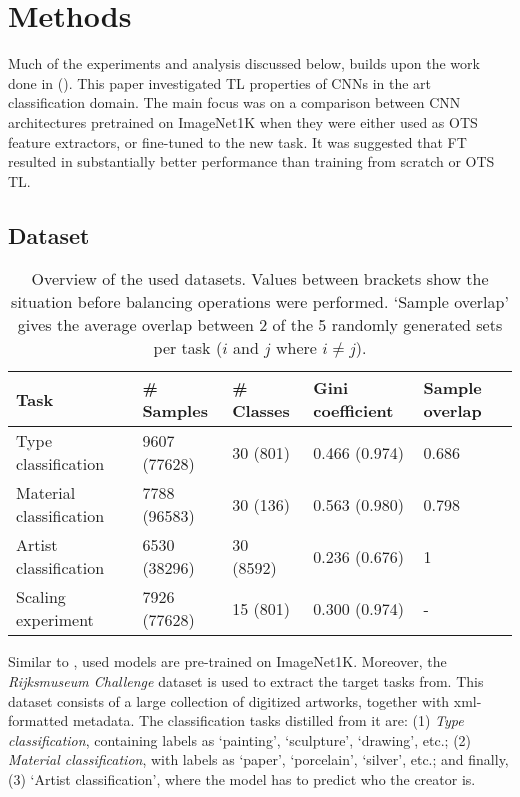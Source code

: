 \section{Methods}

Much of the experiments and analysis discussed below, builds upon the work done in \citeauthor{sabatelli2018deep} (\citeyear{sabatelli2018deep}). This paper investigated TL properties of CNNs in the art classification domain. The main focus was on a comparison between CNN architectures pretrained on ImageNet1K when they were either used as OTS feature extractors, or fine-tuned to the new task. It was suggested that FT resulted in substantially better performance than training from scratch or OTS TL.

\subsection{Dataset}

\begin{table*}[tb]
\centering
\small
\begin{tabular}{lllll}
\hline
\textbf{Task} & \textbf{\# Samples} & \textbf{\# Classes} & \textbf{Gini coefficient} & \textbf{Sample overlap} \\ \hline
Type classification & 9607 (77628) & 30 (801) & 0.466 (0.974) & 0.686 \\
Material classification & 7788 (96583) & 30 (136) & 0.563 (0.980) & 0.798 \\
Artist classification & 6530 (38296) & 30 (8592) & 0.236 (0.676) & 1 \\
Scaling experiment & 7926 (77628) & 15 (801) & 0.300 (0.974) & - \\ \hline
\end{tabular}
\caption{Overview of the used datasets. Values between brackets show the situation before balancing operations were performed. `Sample overlap' gives the average overlap between 2 of the 5 randomly generated sets per task ($i$ and $j$ where $i \neq j$).}
\label{methods:datasets}
\end{table*}

Similar to \citeauthor{sabatelli2018deep}, used models are pre-trained on ImageNet1K. Moreover, the \textit{Rijksmuseum Challenge} dataset \citep{mensink14icmr} is used to extract the target tasks from. This dataset consists of a large collection of digitized artworks, together with xml-formatted metadata. The classification tasks distilled from it are: (1) \textit{Type classification}, containing labels as `painting', `sculpture', `drawing', etc.; (2) \textit{Material classification}, with labels as `paper', `porcelain', `silver', etc.; and finally, (3) `Artist classification', where the model has to predict who the creator is.

